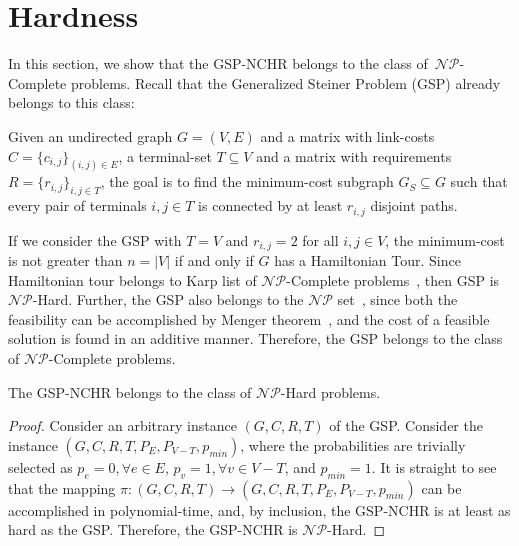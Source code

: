

\section{Hardness}
In this section, we show that the GSP-NCHR belongs to the class of~$\mathcal{NP}$-Complete problems. Recall that the Generalized Steiner Problem (GSP) already belongs to this class:

\begin{definition}
Given an undirected graph $G=(V,E)$ and a matrix with link-costs $C=\{c_{i,j}\}_{(i,j)\in E}$, a terminal-set $T \subseteq V$ and 
a matrix with requirements $R=\{r_{i,j}\}_{i,j\in T}$, the goal is to find the minimum-cost subgraph $G_S \subseteq G$ 
such that every pair of terminals $i,j \in T$ is connected by at least $r_{i,j}$ disjoint paths.
\end{definition}

If we consider the GSP with $T=V$ and $r_{i,j}=2$ for all $i,j \in V$, the minimum-cost is not greater than $n=|V|$ if and only 
if $G$ has a Hamiltonian Tour. Since Hamiltonian tour belongs to Karp list of $\mathcal{NP}$-Complete problems~\cite{104}, then GSP is $\mathcal{NP}$-Hard. 
Further, the GSP also belongs to the $\mathcal{NP}$ set~\cite{27}, since both the feasibility can be accomplished by Menger theorem~\cite{121}, and 
the cost of a feasible solution is found in an additive manner. Therefore, the GSP belongs to the class of $\mathcal{NP}$-Complete problems.   

\begin{theorem}\label{hard-problem}
The GSP-NCHR belongs to the class of $\mathcal{NP}$-Hard problems.
\end{theorem}
\begin{proof}
Consider an arbitrary instance $(G,C,R,T)$ of the GSP. Consider the instance $(G,C,R,T,P_E,P_{V-T},p_{min})$, where 
the probabilities are trivially selected as $p_e=0, \forall e\in E$, $p_v = 1, \forall v\in V-T$, and $p_{min}=1$. 
It is straight to see that the mapping $\pi: (G,C,R,T) \to  (G,C,R,T,P_E,P_{V-T},p_{min})$ can be accomplished in polynomial-time, 
and, by inclusion, the GSP-NCHR is at least as hard as the GSP. Therefore, the GSP-NCHR is $\mathcal{NP}$-Hard. 
\end{proof}

